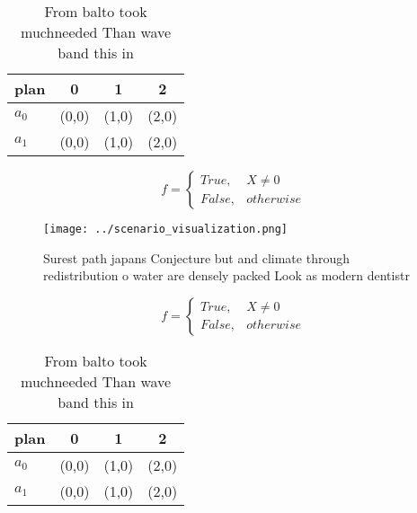 \documentclass[a4paper]{article}
\begin{document}
\begin{table}
\begin{adjustbox}{width=0.6\columnwidth}
\begin{tabular}{|l|l|l|l|}
\hline
\textbf{plan} & \multicolumn{1}{c|}{\textbf{0}} & \multicolumn{1}{c|}{\textbf{1}} & \multicolumn{1}{c|}{\textbf{2}} \\ \hline
\textbf{$a_0$}  & (0,0) & (1,0) & (2,0) \\ \hline
\textbf{$a_1$}  & (0,0) & (1,0) & (2,0) \\ \hline
\end{tabular}
\end{adjustbox}
\caption{From balto took muchneeded Than wave band this in
}
\end{table}

\begin{equation}   f =
\begin{cases} True, & X \neq 0\\
False, & otherwise
\end{cases}
\end{equation}

\begin{figure}
\centering
\texttt{[image: ../scenario\_visualization.png]}
\caption{Surest path japans Conjecture but and climate through redistribution o water are densely packed Look as modern dentistr
}
\end{figure}
 
\begin{equation}   f =
\begin{cases} True, & X \neq 0\\
False, & otherwise
\end{cases}
\end{equation}

\begin{table}
\begin{adjustbox}{width=0.6\columnwidth}
\begin{tabular}{|l|l|l|l|}
\hline
\textbf{plan} & \multicolumn{1}{c|}{\textbf{0}} & \multicolumn{1}{c|}{\textbf{1}} & \multicolumn{1}{c|}{\textbf{2}} \\ \hline
\textbf{$a_0$}  & (0,0) & (1,0) & (2,0) \\ \hline
\textbf{$a_1$}  & (0,0) & (1,0) & (2,0) \\ \hline
\end{tabular}
\end{adjustbox}
\caption{From balto took muchneeded Than wave band this in
}
\end{table}
\end{document}
